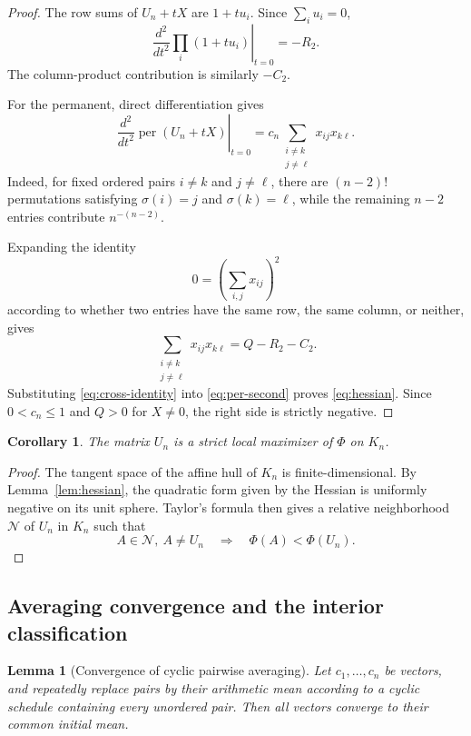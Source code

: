 \documentclass[11pt]{article}
\newtheorem{lemma}[theorem]{Lemma}
\newtheorem{corollary}[theorem]{Corollary}
\theoremstyle{definition}
\newcommand{\per}{\operatorname{per}}
\newcommand{\1}{\mathbf{1}}
\begin{document}
\begin{proof}
The row sums of $U_n+tX$ are $1+tu_i$.  Since $\sum_i u_i=0$,
\[
 \left.\frac{d^2}{dt^2}\prod_i(1+tu_i)\right|_{t=0}
 =-R_2.
\]
The column-product contribution is similarly $-C_2$.

For the permanent, direct differentiation gives
\[
 \left.\frac{d^2}{dt^2}\per(U_n+tX)\right|_{t=0}
 =c_n\sum_{\substack{i\ne k\\j\ne\ell}}x_{ij}x_{k\ell}.
 \tag{4.4}\label{eq:per-second}
\]
Indeed, for fixed ordered pairs $i\ne k$ and $j\ne\ell$, there are $(n-2)!$ permutations satisfying $\sigma(i)=j$ and $\sigma(k)=\ell$, while the remaining $n-2$ entries contribute $n^{-(n-2)}$.

Expanding the identity
\[
 0=\left(\sum_{i,j}x_{ij}\right)^2
\]
according to whether two entries have the same row, the same column, or neither, gives
\[
 \sum_{\substack{i\ne k\\j\ne\ell}}x_{ij}x_{k\ell}
 =Q-R_2-C_2.
 \tag{4.5}\label{eq:cross-identity}
\]
Substituting \eqref{eq:cross-identity} into \eqref{eq:per-second} proves \eqref{eq:hessian}.  Since $0<c_n\le1$ and $Q>0$ for $X\ne0$, the right side is strictly negative.
\end{proof}

\begin{corollary}\label{cor:strict-local}
The matrix $U_n$ is a strict local maximizer of $\Phi$ on $K_n$.
\end{corollary}

\begin{proof}
The tangent space of the affine hull of $K_n$ is finite-dimensional.  By Lemma~\ref{lem:hessian}, the quadratic form given by the Hessian is uniformly negative on its unit sphere.  Taylor's formula then gives a relative neighborhood $\mathcal N$ of $U_n$ in $K_n$ such that
\[
 A\in\mathcal N,\ A\ne U_n
 \quad\Longrightarrow\quad
 \Phi(A)<\Phi(U_n).
\]
\end{proof}

\subsection{Averaging convergence and the interior classification}

\begin{lemma}[Convergence of cyclic pairwise averaging]\label{lem:averaging-convergence}
Let $c_1,\dots,c_n$ be vectors, and repeatedly replace pairs by their arithmetic mean according to a cyclic schedule containing every unordered pair.  Then all vectors converge to their common initial mean.
\end{lemma}
\end{document}

